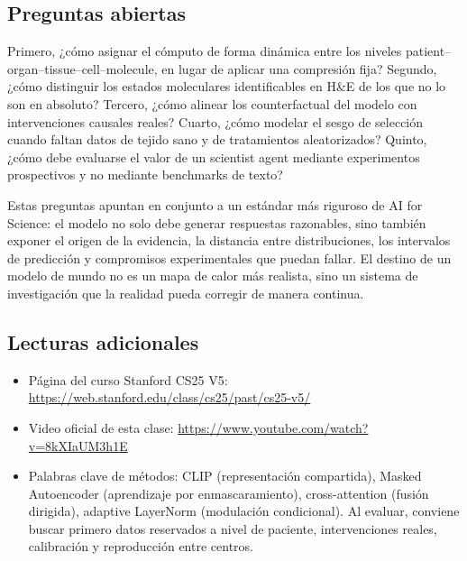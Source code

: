\subsection{Preguntas abiertas}

Primero, ¿cómo asignar el cómputo de forma dinámica entre los niveles patient--organ--tissue--cell--molecule, en lugar de aplicar una compresión fija? Segundo, ¿cómo distinguir los estados moleculares identificables en H\&E de los que no lo son en absoluto? Tercero, ¿cómo alinear los counterfactual del modelo con intervenciones causales reales? Cuarto, ¿cómo modelar el sesgo de selección cuando faltan datos de tejido sano y de tratamientos aleatorizados? Quinto, ¿cómo debe evaluarse el valor de un scientist agent mediante experimentos prospectivos y no mediante benchmarks de texto?

Estas preguntas apuntan en conjunto a un estándar más riguroso de AI for Science: el modelo no solo debe generar respuestas razonables, sino también exponer el origen de la evidencia, la distancia entre distribuciones, los intervalos de predicción y compromisos experimentales que puedan fallar. El destino de un modelo de mundo no es un mapa de calor más realista, sino un sistema de investigación que la realidad pueda corregir de manera continua.

\subsection{Lecturas adicionales}

\begin{itemize}[itemsep=0.2em,topsep=0.2em]
  \item Página del curso Stanford CS25 V5: \url{https://web.stanford.edu/class/cs25/past/cs25-v5/}
  \item Video oficial de esta clase: \url{https://www.youtube.com/watch?v=8kXIaUM3h1E}
  \item Palabras clave de métodos: CLIP (representación compartida), Masked Autoencoder (aprendizaje por enmascaramiento), cross-attention (fusión dirigida), adaptive LayerNorm (modulación condicional). Al evaluar, conviene buscar primero datos reservados a nivel de paciente, intervenciones reales, calibración y reproducción entre centros.
\end{itemize}


